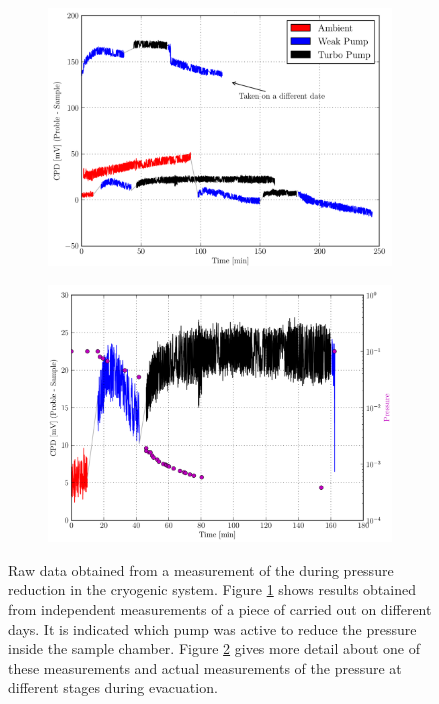 \begin{figure}
\begin{subfigure}{0.5\textwidth}
\centering
	\includegraphics[width=0.95\linewidth]{./figs/HOPGMcA}
	\caption{}
	\label{fig:hopg-p1}
\end{subfigure}
\begin{subfigure}{0.5\textwidth}
\centering
	\includegraphics[width=0.95\linewidth]{./figs/HOPGMcAPres}
	\caption{}
	\label{fig:hopg-p2}
\end{subfigure}
\caption{Raw data obtained from a measurement of the \cpd{} during pressure reduction in the \McA cryogenic system. Figure \ref{fig:hopg-p1} shows results obtained from independent measurements of a piece of \hopg{} carried out on different days. It is indicated which pump was active to reduce the pressure inside the sample chamber. Figure \ref{fig:hopg-p2} gives more detail about one of these measurements and actual measurements of the pressure at different stages during evacuation.}
\label{fig:hopg-p}
\end{figure}
